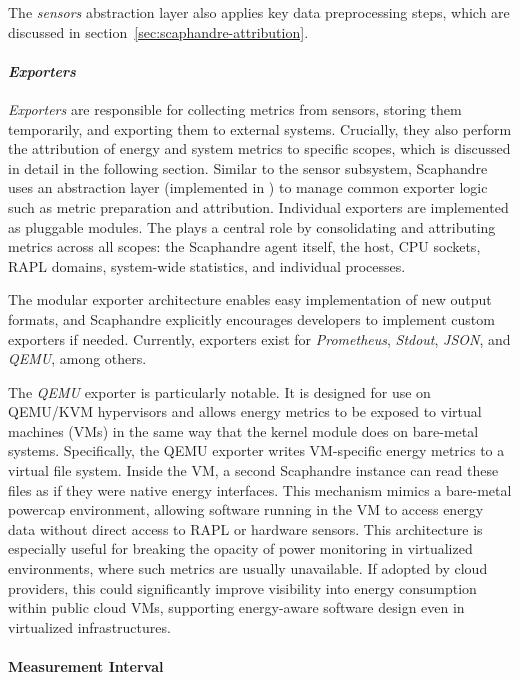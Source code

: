 The \textit{sensors} abstraction layer also applies key data preprocessing steps, which are discussed in section~\ref{sec:scaphandre-attribution}.

\paragraph{\textit{Exporters}}

\textit{Exporters} are responsible for collecting metrics from sensors, storing them temporarily, and exporting them to external systems. Crucially, they also perform the attribution of energy and system metrics to specific scopes, which is discussed in detail in the following section. Similar to the sensor subsystem, Scaphandre uses an abstraction layer (implemented in ) to manage common exporter logic such as metric preparation and attribution. Individual exporters are implemented as pluggable modules. The  plays a central role by consolidating and attributing metrics across all scopes: the Scaphandre agent itself, the host, CPU sockets, RAPL domains, system-wide statistics, and individual processes.

The modular exporter architecture enables easy implementation of new output formats, and Scaphandre explicitly encourages developers to implement custom exporters if needed. Currently, exporters exist for \textit{Prometheus}, \textit{Stdout}, \textit{JSON}, and \textit{QEMU}, among others.

The \textit{QEMU} exporter is particularly notable. It is designed for use on QEMU/KVM hypervisors and allows energy metrics to be exposed to virtual machines (VMs) in the same way that the  kernel module does on bare-metal systems. Specifically, the QEMU exporter writes VM-specific energy metrics to a virtual file system. Inside the VM, a second Scaphandre instance can read these files as if they were native energy interfaces. This mechanism mimics a bare-metal powercap environment, allowing software running in the VM to access energy data without direct access to RAPL or hardware sensors. This architecture is especially useful for breaking the opacity of power monitoring in virtualized environments, where such metrics are usually unavailable. If adopted by cloud providers, this could significantly improve visibility into energy consumption within public cloud VMs, supporting energy-aware software design even in virtualized infrastructures.

\paragraph{Measurement Interval}

